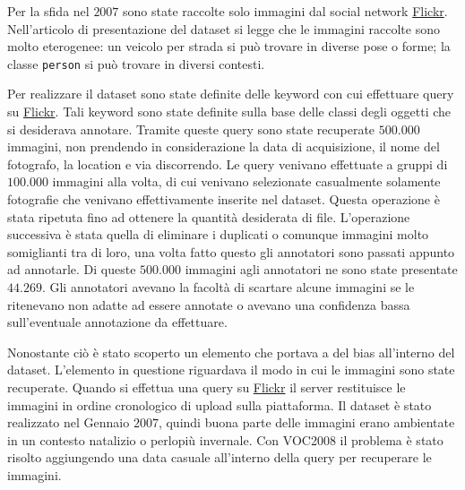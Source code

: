 Per la sfida nel $2007$ sono state raccolte solo immagini dal social network \href{https://www.flickr.com/}{Flickr}. Nell'articolo di presentazione del dataset \cite{everingham2010pascal} si legge che le immagini raccolte sono molto eterogenee: un veicolo per strada si può trovare in diverse pose o forme; la classe \texttt{person} si può trovare in diversi contesti.

Per realizzare il dataset sono state definite delle keyword con cui effettuare query su \href{https://www.flickr.com/}{Flickr}. Tali keyword sono state definite sulla base delle classi degli oggetti che si desiderava annotare. Tramite queste query sono state recuperate $500.000$ immagini, non prendendo in considerazione la data di acquisizione, il nome del fotografo, la location e via discorrendo. 
Le query venivano effettuate a gruppi di $100.000$ immagini alla volta, di cui venivano selezionate casualmente solamente fotografie che venivano effettivamente inserite nel dataset. Questa operazione è stata ripetuta fino ad ottenere la quantità desiderata di file. 
L'operazione successiva è stata quella di eliminare i duplicati o comunque immagini molto somiglianti tra di loro, una volta fatto questo gli annotatori sono passati appunto ad annotarle. Di queste $500.000$ immagini agli annotatori ne sono state presentate $44.269$. Gli annotatori avevano la facoltà di scartare alcune immagini se le ritenevano non adatte ad essere annotate o avevano una confidenza bassa sull'eventuale annotazione da effettuare.

Nonostante ciò è stato scoperto un elemento che portava a del bias all'interno del dataset. L'elemento in questione riguardava il modo in cui le immagini sono state recuperate. Quando si effettua una query su \href{https://www.flickr.com/}{Flickr} il server restituisce le immagini in ordine cronologico di upload sulla piattaforma. Il dataset è stato realizzato nel Gennaio $2007$, quindi buona parte delle immagini erano ambientate in un contesto natalizio o perlopiù invernale. Con VOC2008 il problema è stato risolto aggiungendo una data casuale all'interno della query per recuperare le immagini.  

